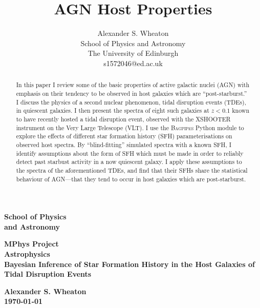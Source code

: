 \documentclass[a4paper,11pt]{article}
\title{AGN Host Properties}
\author{
    Alexander S. Wheaton\\
    School of Physics and Astronomy\\
    The University of Edinburgh\\
    s1572046@ed.ac.uk\break
}
\begin{document}
\thispagestyle{empty}                   %
\epsfxsize=40mm                         %
\begin{minipage}[b]{110mm}
    {\Huge\bf School of Physics\\ and Astronomy
    \vspace*{17mm}}
\end{minipage}
\hfill
\begin{minipage}[t]{40mm}
\end{minipage}
\par\noindent                                           %
\vspace*{2cm}
\begin{center}
    \Large\bf \Large\bf MPhys Project\\
    \Large\bf Astrophysics\\[10pt]                     %
    \LARGE\bf Bayesian Inference of Star Formation History in the Host Galaxies of Tidal Disruption Events
\end{center}
\vspace*{0.5cm}
\begin{center}
    \bf Alexander S. Wheaton\\
    \today
\end{center}
\vspace*{5mm}

\begin{abstract}
    \noindent In this paper I review some of the basic properties of active galactic nuclei (AGN) with emphasis on their tendency to be observed in host galaxies which are ``post-starburst.'' I discuss the physics of a second nuclear phenomenon, tidal disruption events (TDEs), in quiescent galaxies. I then present the spectra of eight such galaxies at $z < 0.1$ known to have recently hosted a tidal disruption event, observed with the XSHOOTER instrument on the Very Large Telescope (VLT). I use the \textsc{Bagpipes} Python module to explore the effects of different star formation history (SFH) parameterisations on observed host spectra. By ``blind-fitting'' simulated spectra with a known SFH, I identify assumptions about the form of SFH which must be made in order to reliably detect past starbust activity in a now quiescent galaxy. I apply these assumptions to the spectra of the aforementioned TDEs, and find that their SFHs share the statistical behaviour of AGN---that they tend to occur in host galaxies which are post-starburst.
\end{abstract}
\end{document}
